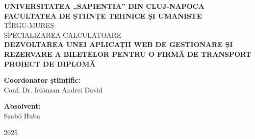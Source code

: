 \begin{titlepage}
    \centering
    \vspace*{2cm}

    {\Large \textbf{UNIVERSITATEA „SAPIENTIA” DIN CLUJ-NAPOCA}}\\[0.2cm]
    {\Large \textbf{FACULTATEA DE ȘTIINȚE TEHNICE ȘI UMANISTE}}\\[0.5cm]
    {\large TÎRGU-MUREȘ}\\[0.2cm]
    {\large  SPECIALIZAREA CALCULATOARE}\\[3cm]

    {\LARGE \textbf{DEZVOLTAREA UNEI APLICAȚII WEB DE GESTIONARE ȘI REZERVARE A BILETELOR PENTRU O FIRMĂ DE TRANSPORT}}\\[0.5cm]
    {\LARGE \textbf{ PROIECT DE DIPLOMĂ}}\\[4cm]
    

    \noindent
\begin{minipage}[t]{0.48\textwidth}
    \raggedright
    \textbf{Coordonator științific:}\\[1em]
    Conf. Dr. Iclănzan Andrei David
\end{minipage}
\hfill
\begin{minipage}[t]{0.48\textwidth}
    \raggedleft
    \textbf{Absolvent:}\\[1em]
    Szabó Huba
\end{minipage}


    \vfill

    {\large  2025}

\end{titlepage}
